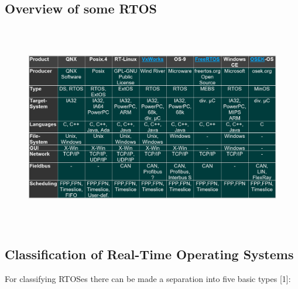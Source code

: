 \subsection{ Overview of some RTOS}

 	\begin{figure}[h]
    \centering
    \includegraphics[width=15cm, height=9cm]{Images/image127.png}
    \label{fig:Fig }
    \end{figure}

\subsection{ Classification of Real-Time Operating Systems}

For classifying RTOSes there can be made a separation into five basic types [1]:

